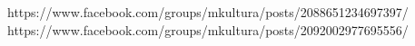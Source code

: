  
 
 
 
 

https://www.facebook.com/groups/mkultura/posts/2088651234697397/
https://www.facebook.com/groups/mkultura/posts/2092002977695556/

